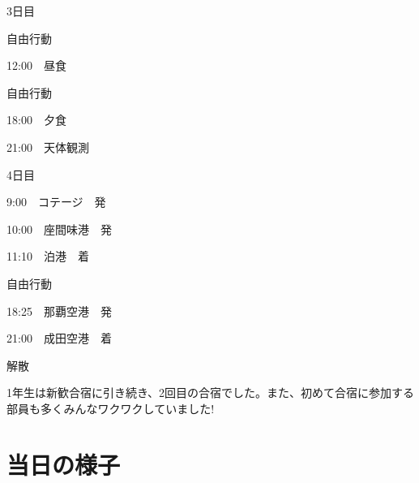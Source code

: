 \documentclass[../main]{subfiles}
\begin{document}
\begin{multicols}{2}
  \small
  \begin{itembox}[l]{3日目}
    \begin{description}
        \item 自由行動
        \item 12:00　昼食
        \item 自由行動
        \item 18:00　夕食
        \item 21:00　天体観測

    \end{description}
  \end{itembox}
  \begin{itembox}[l]{4日目}
    \begin{description}
        \item  9:00　コテージ　発
        \item 10:00　座間味港　発
        \item 11:10　泊港　着
        \item 自由行動
        \item 18:25　那覇空港　発
        \item 21:00　成田空港　着
        \item 解散
    \end{description}
  \end{itembox}
\end{multicols}

1年生は新歓合宿に引き続き、2回目の合宿でした。また、初めて合宿に参加する部員も多くみんなワクワクしていました!
\\

\section{当日の様子}
\end{document}
